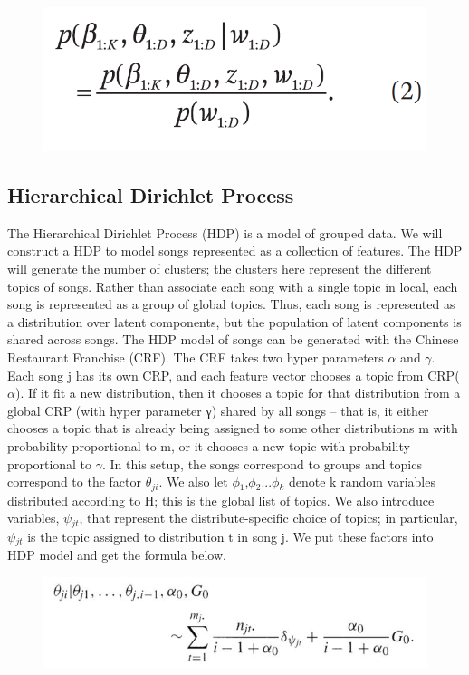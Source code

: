 \documentclass[10pt,twocolumn,letterpaper]{article}
\begin{document}
{{{{\begin{figure}[h]
            \includegraphics[width=.6\linewidth]{2.jpg}
            \label{fig:graph1}
        \end{figure}
\subsection{Hierarchical Dirichlet Process}
The Hierarchical Dirichlet Process (HDP) is a model of grouped data. We will construct a HDP to model songs represented as a collection of features. The HDP will generate the number of clusters; the clusters here represent the different topics of songs.
Rather than associate each song with a single topic in local, each song is represented as a group of global topics. Thus, each song is represented as a distribution over latent components, but the population of latent components is shared across songs. The HDP model of songs can be generated with the Chinese Restaurant Franchise (CRF). The CRF takes two hyper parameters $\alpha$ and $\gamma$. Each song j has its own CRP, and each feature vector chooses a topic from CRP($\alpha$). If it fit a new distribution, then it chooses a topic for that distribution from a global CRP (with hyper parameter γ) shared by all songs – that is, it either chooses a topic that is already being assigned to some other distributions m with probability proportional to m, or it chooses a new topic with probability proportional to $\gamma$. In this setup, the songs correspond to groups and topics correspond to the factor $\theta$$_{ji}$. We also let $\phi$$_{1}$,$\phi$$_{2}$...$\phi$$_{k}$ denote k random variables distributed according to H; this is the global list of topics. We also introduce variables, $\psi$$_{jt}$, that represent the distribute-specific choice of topics; in particular, $\psi$$_{jt}$ is the topic assigned to distribution t in song j\cite{hdp2}. We put these factors into HDP model and get the formula below.

\begin{figure}[h]
            \includegraphics[width=.6\linewidth]{3.jpg}
            \label{fig:graph1}
        \end{figure}


}}}}
\end{document}
